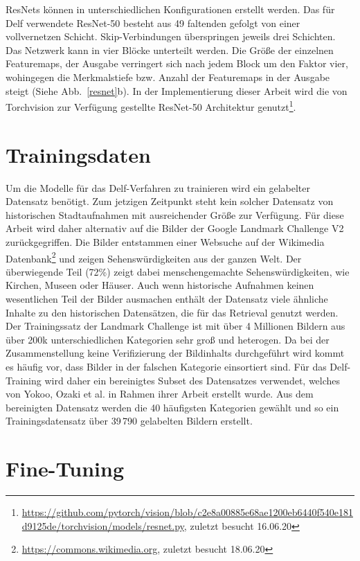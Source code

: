 ResNets können in unterschiedlichen Konfigurationen erstellt werden. Das für Delf verwendete \mbox{ResNet-50} besteht aus 49 faltenden gefolgt von einer vollvernetzen Schicht. Skip-Verbindungen überspringen jeweils drei Schichten. Das Netzwerk kann in vier Blöcke unterteilt werden. Die Größe der einzelnen Featuremaps, der Ausgabe verringert sich nach jedem Block um den Faktor vier, wohingegen die Merkmalstiefe bzw. Anzahl der Featuremaps in der Ausgabe steigt (Siehe Abb.~\ref{resnet}b). In der Implementierung dieser Arbeit wird die von Torchvision zur Verfügung gestellte ResNet-50 Architektur genutzt\footnote{\url{https://github.com/pytorch/vision/blob/c2e8a00885e68ae1200eb6440f540e181d9125de/torchvision/models/resnet.py}, zuletzt besucht 16.06.20}. 


\section{Trainingsdaten}
Um die Modelle für das Delf-Verfahren zu trainieren wird ein gelabelter Datensatz benötigt. Zum jetzigen Zeitpunkt steht kein solcher Datensatz von historischen Stadtaufnahmen mit ausreichender Größe zur Verfügung. Für diese Arbeit wird daher alternativ auf die Bilder der Google Landmark Challenge V2 \cite{landmarks_v2} zurückgegriffen. Die Bilder entstammen einer Websuche auf der Wikimedia Datenbank\footnote{\url{https://commons.wikimedia.org}, zuletzt besucht 18.06.20} und zeigen Sehenswürdigkeiten aus der ganzen Welt. Der überwiegende Teil (72\%) zeigt dabei menschengemachte Sehenswürdigkeiten, wie Kirchen, Museen oder Häuser. Auch wenn historische Aufnahmen keinen wesentlichen Teil der Bilder ausmachen enthält der Datensatz viele ähnliche Inhalte zu den historischen Datensätzen, die für das Retrieval genutzt werden. Der Trainingssatz der Landmark Challenge ist mit über 4 Millionen Bildern aus über 200k unterschiedlichen Kategorien sehr groß und heterogen. Da bei der Zusammenstellung keine Verifizierung der Bildinhalts durchgeführt wird kommt es häufig vor, dass Bilder in der falschen Kategorie einsortiert sind. Für das Delf-Training wird daher ein bereinigtes Subset des Datensatzes verwendet, welches von Yokoo, Ozaki et al. in Rahmen ihrer Arbeit \cite{landmarks_verified} erstellt wurde. Aus dem bereinigten Datensatz werden die 40 häufigsten Kategorien gewählt und so ein Trainingsdatensatz über 39\,790 gelabelten Bildern erstellt. 

\section{Fine-Tuning}


